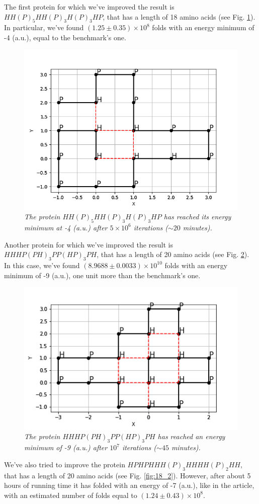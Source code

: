 The first protein for which we've improved the result is $HH(P)_5HH(P)_3H(P)_3HP$, that has a length of 18 amino acids (see Fig. \ref{fig:18_1}).
In particular, we've found $(1.25 \pm 0.35) \times 10^8$ folds with an energy minimum of -4 (a.u.), equal to the benchmark's one.
\begin{figure}[H]
    \centering
    \includegraphics[width=.6\textwidth]{./img/18_1.png}
    \caption{\emph{The protein $HH(P)_5HH(P)_3H(P)_3HP$ has reached its energy minimum at -4 (a.u.) after $5 \times 10^6$ iterations ($\sim 20$ minutes).}}
    \label{fig:18_1}
\end{figure}
Another protein for which we've improved the result is $HHHP(PH)_3PP(HP)_3PH$, that has a length of 20 amino acids (see Fig. \ref{fig:20_2}).
In this case, we've found $(8.9688 \pm 0.0033) \times 10^{10}$ folds with an energy minimum of -9 (a.u.), one unit more than the benchmark's one.
\begin{figure}[H]
    \centering
    \includegraphics[width=.6\textwidth]{./img/20_2.png}
    \caption{\emph{The protein $HHHP(PH)_3PP(HP)_3PH$ has reached an energy minimum of -9 (a.u.) after $10^7$ iterations ($\sim 45$ minutes).}}
    \label{fig:20_2}
\end{figure}
We've also tried to improve the protein $HPHPHHH(P)_3HHHH(P)_2HH$, that has a length of 20 amino acids (see Fig. \ref{fig:18_2}).
However, after about 5 hours of running time it has folded with an energy of -7 (a.u.), like in the article, with an estimated number of folds equal to $(1.24 \pm 0.43) \times 10^8$.
